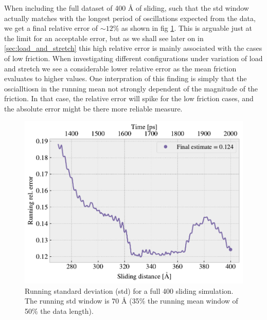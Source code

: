 When including the full dataset of 400 Å of sliding, such that the std window actually matches with the longest period of oscillations expected from the data, we get a final relative error of $\sim 12 \%$ as shown in fig \cref{fig:runstd_long}. This is arguable just at the limit for an acceptable error, but as we shall see later on in \cref{sec:load_and_stretch} this high relative error is mainly associated with the cases of low friction. When investigating different configurations under variation of load and stretch we see a considerable lower relative error as the mean friction evaluates to higher values. One interpration of this finding is simply that the oscialltiosn in the running mean not strongly dependent of the magnitude of the friction. In that case, the relative error will spike for the low friction cases, and the absolute error might be there more reliable measure.


\begin{figure}[H]
  \centering
  \includegraphics[width=0.6\linewidth]{figures/baseline/Ff_runstd_long.pdf}
  \caption{Running standard deviation (std) for a full \SI{400}{{}} sliding simulation. The running std window is 70 Å (35\% the running mean window of 50\% the data length).}
  \label{fig:runstd_long}
\end{figure}



